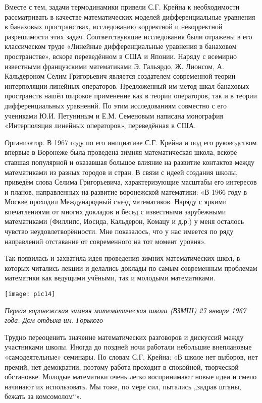 Вместе с тем, задачи термодинамики привели С.Г. Крейна к необходимости рассматривать в качестве математических моделей дифференциальные уравнения в банаховых пространствах, исследованию корректной и некорректной разрешимости этих задач. Соответствующие исследования были отражены в его классическом труде «Линейные дифференциальные уравнения в банаховом пространстве», вскоре переведённом в США и Японии. Наряду с всемирно известными французскими математиками Э. Гальярдо, Ж. Лионсом, А. Кальдероном Селим Григорьевич является создателем современной теории интерполяции линейных операторов. Предложенный им метод шкал банаховых пространств нашёл широкое применение как в теории операторов, так и в теории дифференциальных уравнений. По этим исследованиям совместно с его учениками Ю.И. Петуниным и Е.М. Семеновым написана монография «Интерполяция линейных операторов», переведённая в США.

Организатор. В 1967 году по его инициативе С.Г. Крейна и под его руководством впервые в Воронеже была проведена зимняя математическая школа, вскоре ставшая популярной и оказавшая большое влияние на развитие контактов между математиками из разных городов и стран. В связи с идеей создания школы, приведём слова Селима Григорьевича, характеризующие масштабы его интересов и планов, направленных на развитие воронежской математики: «В 1966 году в Москве проходил Международный съезд математиков. Наряду с яркими впечатлениями от многих докладов и бесед с известными зарубежными математиками (Филлипс, Иосида, Кальдерон, Комацу и д.р.) у меня осталось чувство неудовлетворённости. Мне показалось, что у нас имеется по ряду направлений отставание от современного на тот момент уровня».

Так появилась и захватила идея проведения зимних математических школ, в которых читались лекции и делались доклады по самым современным проблемам математики как ведущими учёными, так и молодыми математиками.


\begin{center}

\texttt{[image: pic14]}


{\it Первая воронежская зимняя математическая школа (ВЗМШ)
27 января 1967 года. Дом отдыха им. Горького}
\end{center}

Трудно переоценить значение математических разговоров и дискуссий между участниками школы. Иногда до поздней ночи работали небольшие внеплановые «самодеятельные» семинары. По словам С.Г. Крейна: «В школе нет выборов, нет премий, нет демократии, поэтому работа проходит в спокойной, творческой обстановке. Молодые математики очень легко воспринимают новые идеи и смело начинают их использовать. Мы тоже, по мере сил, пытались „задрав штаны, бежать за комсомолом“».


